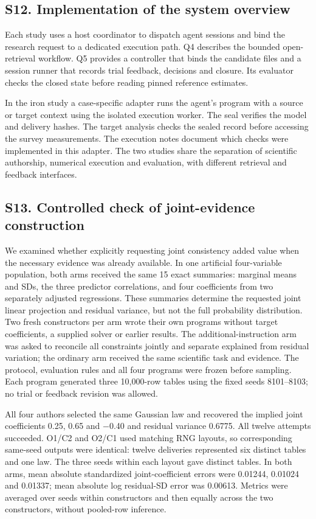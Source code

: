 \documentclass[11pt,letterpaper]{article}
\begin{document}
\subsection*{S12. Implementation of the system overview}

Each study uses a host coordinator to dispatch agent sessions and bind the research request to a dedicated execution path. Q4 describes the bounded open-retrieval workflow. Q5 provides a controller that binds the candidate files and a session runner that records trial feedback, decisions and closure. Its evaluator checks the closed state before reading pinned reference estimates.


In the iron study a case-specific adapter runs the agent's program with a source or target context using the isolated execution worker. The seal verifies the model and delivery hashes. The target analysis checks the sealed record before accessing the survey measurements. The execution notes document which checks were implemented in this adapter. The two studies share the separation of scientific authorship, numerical execution and evaluation, with different retrieval and feedback interfaces.


\clearpage

\subsection*{S13. Controlled check of joint-evidence construction}

We examined whether explicitly requesting joint consistency added value when the necessary evidence was already available. In one artificial four-variable population, both arms received the same 15 exact summaries: marginal means and SDs, the three predictor correlations, and four coefficients from two separately adjusted regressions. These summaries determine the requested joint linear projection and residual variance, but not the full probability distribution. Two fresh constructors per arm wrote their own programs without target coefficients, a supplied solver or earlier results. The additional-instruction arm was asked to reconcile all constraints jointly and separate explained from residual variation; the ordinary arm received the same scientific task and evidence. The protocol, evaluation rules and all four programs were frozen before sampling. Each program generated three 10,000-row tables using the fixed seeds 8101–\allowbreak{}8103; no trial or feedback revision was allowed.


All four authors selected the same Gaussian law and recovered the implied joint coefficients 0.25, 0.65 and −0.40 and residual variance 0.6775. All twelve attempts succeeded. O1/\allowbreak{}C2 and O2/\allowbreak{}C1 used matching RNG layouts, so corresponding same-seed outputs were identical: twelve deliveries represented six distinct tables and one law. The three seeds within each layout gave distinct tables. In both arms, mean absolute standardized joint-coefficient errors were 0.01244, 0.01024 and 0.01337; mean absolute log residual-SD error was 0.00613. Metrics were averaged over seeds within constructors and then equally across the two constructors, without pooled-row inference.
\end{document}
